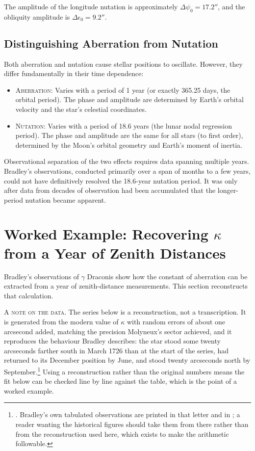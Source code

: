 The amplitude of the longitude nutation is approximately $\Delta \psi_0 = 17.2''$, and the obliquity amplitude is $\Delta \epsilon_0 = 9.2''$.

\subsection*{Distinguishing Aberration from Nutation}

Both aberration and nutation cause stellar positions to oscillate. However, they differ fundamentally in their time dependence:

\begin{itemize}
  \item \textsc{Aberration:} Varies with a period of 1 year (or exactly 365.25 days, the orbital period). The phase and amplitude are determined by Earth's orbital velocity and the star's celestial coordinates.
  
  \item \textsc{Nutation:} Varies with a period of 18.6 years (the lunar nodal regression period). The phase and amplitude are the same for all stars (to first order), determined by the Moon's orbital geometry and Earth's moment of inertia.
\end{itemize}

Observational separation of the two effects requires data spanning multiple years. Bradley's observations, conducted primarily over a span of months to a few years, could not have definitively resolved the 18.6-year nutation period. It was only after data from decades of observation had been accumulated that the longer-period nutation became apparent.

\section{Worked Example: Recovering $\kappa$ from a Year of Zenith Distances}

Bradley's observations of $\gamma$ Draconis show how the constant of aberration can be extracted from a year of zenith-distance measurements. This section reconstructs that calculation.

\textsc{A note on the data.} The series below is a reconstruction, not a transcription. It is generated from the modern value of $\kappa$ with random errors of about one arcsecond added, matching the precision Molyneux's sector achieved, and it reproduces the behaviour Bradley describes: the star stood some twenty arcseconds farther south in March 1726 than at the start of the series, had returned to its December position by June, and stood twenty arcseconds north by September.\footnote{\textcite{Bradley1729}. Bradley's own tabulated observations are printed in that letter and in \textcite{Rigaud1832}; a reader wanting the historical figures should take them from there rather than from the reconstruction used here, which exists to make the arithmetic followable.} Using a reconstruction rather than the original numbers means the fit below can be checked line by line against the table, which is the point of a worked example.

